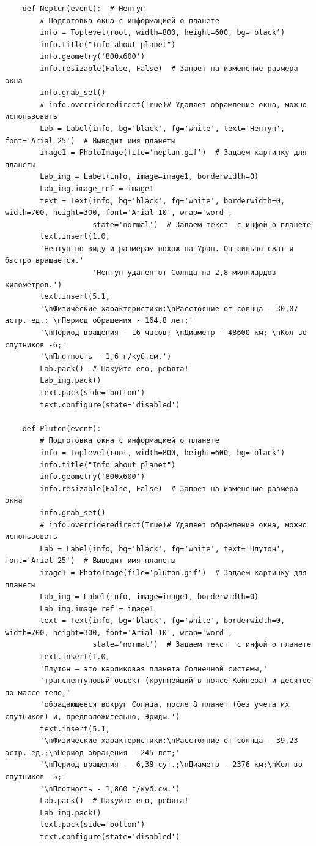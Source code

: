 \documentclass[11pt,a4paper]{report}
\begin{document}
\begin{verbatim}
    def Neptun(event):  # Нептун
        # Подготовка окна с информацией о планете
        info = Toplevel(root, width=800, height=600, bg='black')
        info.title("Info about planet")
        info.geometry('800x600')
        info.resizable(False, False)  # Запрет на изменение размера окна
        info.grab_set()
        # info.overrideredirect(True)# Удаляет обрамление окна, можно использовать
        Lab = Label(info, bg='black', fg='white', text='Нептун', font='Arial 25')  # Выводит имя планеты
        image1 = PhotoImage(file='neptun.gif')  # Задаем картинку для планеты
        Lab_img = Label(info, image=image1, borderwidth=0)
        Lab_img.image_ref = image1
        text = Text(info, bg='black', fg='white', borderwidth=0, width=700, height=300, font='Arial 10', wrap='word',
                    state='normal')  # Задаем текст  с инфой о планете
        text.insert(1.0,
        'Нептун по виду и размерам похож на Уран. Он сильно сжат и быстро вращается.'
                    'Нептун удален от Солнца на 2,8 миллиардов километров.')
        text.insert(5.1,
        '\nФизические характеристики:\nРасстояние от солнца - 30,07 астр. ед.; \nПериод обращения - 164,8 лет;'
        '\nПериод вращения - 16 часов; \nДиаметр - 48600 км; \nКол-во спутников -6;'
        '\nПлотность - 1,6 г/куб.см.')
        Lab.pack()  # Пакуйте его, ребята!
        Lab_img.pack()
        text.pack(side='bottom')
        text.configure(state='disabled')

    def Pluton(event):
        # Подготовка окна с информацией о планете
        info = Toplevel(root, width=800, height=600, bg='black')
        info.title("Info about planet")
        info.geometry('800x600')
        info.resizable(False, False)  # Запрет на изменение размера окна
        info.grab_set()
        # info.overrideredirect(True)# Удаляет обрамление окна, можно использовать
        Lab = Label(info, bg='black', fg='white', text='Плутон', font='Arial 25')  # Выводит имя планеты
        image1 = PhotoImage(file='pluton.gif')  # Задаем картинку для планеты
        Lab_img = Label(info, image=image1, borderwidth=0)
        Lab_img.image_ref = image1
        text = Text(info, bg='black', fg='white', borderwidth=0, width=700, height=300, font='Arial 10', wrap='word',
                    state='normal')  # Задаем текст  с инфой о планете
        text.insert(1.0,
        'Плутон – это карликовая планета Солнечной системы,'
        'транснептуновый объект (крупнейший в поясе Койпера) и десятое по массе тело,'
        'обращающееся вокруг Солнца, после 8 планет (без учета их спутников) и, предположительно, Эриды.')
        text.insert(5.1,
        '\nФизические характеристики:\nРасстояние от солнца - 39,23 астр. ед.;\nПериод обращения - 245 лет;'
        '\nПериод вращения - -6,38 сут.;\nДиаметр - 2376 км;\nКол-во спутников -5;'
        '\nПлотность - 1,860 г/куб.см.')
        Lab.pack()  # Пакуйте его, ребята!
        Lab_img.pack()
        text.pack(side='bottom')
        text.configure(state='disabled')


\end{verbatim}
\end{document}
